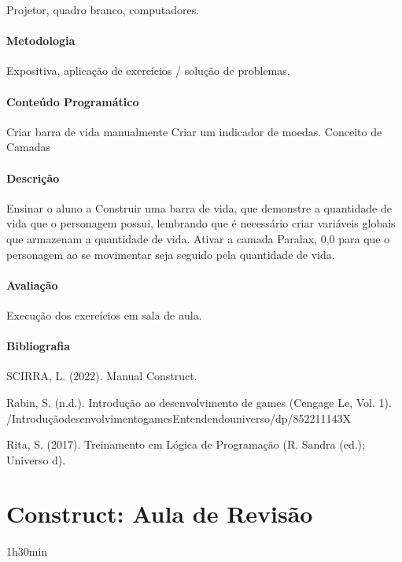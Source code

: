 \documentclass[letterpaper,10pt,brazil]{sphinxmanual}
\begin{document}
\sphinxAtStartPar
Projetor, quadro branco, computadores.
\subsubsection*{Metodologia}

\sphinxAtStartPar
Expositiva, aplicação de exercícios / solução de problemas.
\subsubsection*{Conteúdo Programático}

\sphinxAtStartPar
Criar barra de vida manualmente
Criar um indicador de moedas.
Conceito de Camadas
\subsubsection*{Descrição}

\sphinxAtStartPar
Ensinar o aluno a Construir uma barra de vida, que demonstre a quantidade de vida
que o personagem possui, lembrando que é necessário criar variáveis globais que
armazenam a quantidade de vida.
Ativar a camada Paralax, 0,0 para que o personagem ao se movimentar seja seguido pela
quantidade de vida.
\subsubsection*{Avaliação}

\sphinxAtStartPar
Execução dos exercícios em sala de aula.
\subsubsection*{Bibliografia}

\sphinxAtStartPar
SCIRRA, L. (2022). Manual Construct.

\sphinxAtStartPar
Rabin, S. (n.d.). Introdução ao desenvolvimento de games (Cengage Le, Vol. 1).
/Introdução\sphinxhyphen{}desenvolvimento\sphinxhyphen{}games\sphinxhyphen{}Entendendo\sphinxhyphen{}universo/dp/852211143X

\sphinxAtStartPar
Rita, S. (2017). Treinamento em Lógica de Programação (R. Sandra (ed.); Universo d).

\sphinxstepscope


\chapter{Construct: Aula de Revisão}
\label{\detokenize{modelo_aula_11:construct-aula-de-revisao}}\label{\detokenize{modelo_aula_11::doc}}
\sphinxAtStartPar
{} 1h30min
\end{document}
